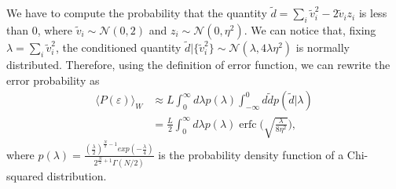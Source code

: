 \documentclass[a4paper]{article}
\DeclareMathOperator\erfc{erfc}
\begin{document}
We have to compute the probability that the quantity $\tilde{d} = \sum_i \tilde{v}_i^2 - 2\tilde{v}_i z_i$ is less than 0, where $\tilde{v}_i \sim \mathcal{N}(0,2)$ and $z_i \sim \mathcal{N}(0,\eta^2)$. 
We can notice that, fixing  $\lambda = \sum_i \tilde{v}^2_i$, the conditioned quantity $ \tilde{d}|\{\tilde{v}_i^2\} \sim \mathcal{N}(\lambda,4\lambda \eta^2) $  is normally distributed. Therefore, using the definition of error function, we can rewrite the error probability as
\begin{equation}
\begin{split}
 \langle P(\varepsilon)\rangle_W &\approx L\int_0^\infty d\lambda p(\lambda) \int_{-\infty}^0  d\tilde{d} p(\tilde{d}|\lambda) \\
 &= \frac{L}{2}\int_0^\infty d\lambda p(\lambda) \erfc{\Big(\sqrt{\frac{\lambda}{8\eta^2}}\Big)},
 \end{split}
\end{equation}
where $p(\lambda) = \frac{(\frac{\lambda}{2})^{\frac{N}{2}-1}exp(-\frac{\lambda}{4})}{2^{\frac{N}{2}+1} \Gamma(N/2)}$ is the probability density function of a Chi-squared distribution. 
\end{document}

